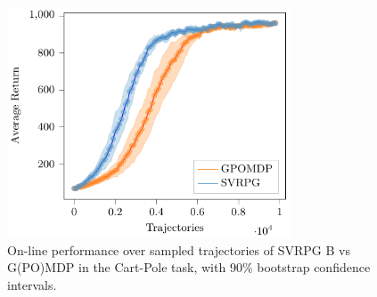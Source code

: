 \begin{figure}[h]
	\begin{minipage}[h]{1\textwidth}
		\centering
		\includegraphics[width=0.75\textwidth]{Images/Experiments/cart_pole_GPOMDP_vs_SVRPG_B.pdf}
		\vspace{-0.1in}
		\caption{On-line performance over sampled trajectories of \acs{SVRPG} B vs G(PO)MDP in the Cart-Pole task, with 90\% bootstrap confidence intervals.}
		\label{fig:cartpole1}
	\end{minipage}
	\vspace{-0.15in}
\end{figure}


